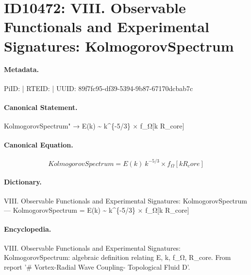 \section*{ID10472: VIII. Observable Functionals and Experimental Signatures: KolmogorovSpectrum}
\paragraph{Metadata.}
PiID:  | RTEID:  | UUID: 89f7fc95-df39-5394-9b87-67170dcbab7c

\paragraph{Canonical Statement.}
KolmogorovSpectrum" → E(k) \textasciitilde{} k\textasciicircum{}\{-5/3\} × f\_Ω[k R\_core]

\paragraph{Canonical Equation.}
\[
KolmogorovSpectrum = E(k) ~ k^{-5/3} × f_Ω[k R_core]
\]

\paragraph{Dictionary.}
VIII. Observable Functionals and Experimental Signatures: KolmogorovSpectrum — KolmogorovSpectrum = E(k) \textasciitilde{} k\textasciicircum{}\{-5/3\} × f\_Ω[k R\_core]

\paragraph{Encyclopedia.}
VIII. Observable Functionals and Experimental Signatures: KolmogorovSpectrum: algebraic definition relating E, k, f\_Ω, R\_core. From report '\# Vortex-Radial Wave Coupling- Topological Fluid D'.
